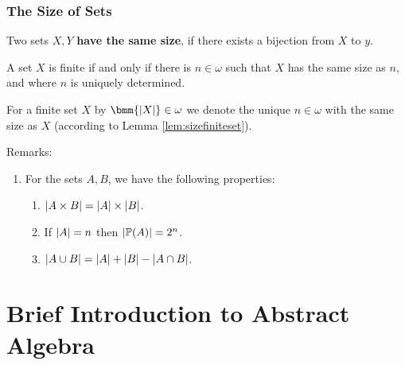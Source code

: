\documentclass[12pt]{book}
\begin{document}
\subsection{The Size of Sets}
\label{sec:sizeofsets}

\begin{defi}\label{def:equalsize}
      Two sets $X, Y$ \textbf{have the same size}, if there exists a bijection from $X$ to $y$.
\end{defi}
\begin{lem}\label{lem:sizefiniteset}
      A set $X$ is finite if and only if there is $n \in \omega$ such that $X$ has the same size as $n$, and where $n$ is uniquely determined.
\end{lem}
\begin{defi}\label{def:sizefiniteset}
      For a finite set $X$ by $\bmm{\abs{X}} \in \omega$ we denote the unique $n \in \omega$ with the same size as $X$ (according to Lemma 
	  \ref{lem:sizefiniteset}).
\end{defi}
Remarks:
\begin{enumerate}
      \item For the sets $A , B$, we have the following properties:
      \begin{enumerate}
            \item $\lvert A \times B  \rvert= \lvert A \rvert \times \lvert B \rvert$.
	        \item If $\lvert A \rvert = n$ then $\lvert \operatorname{\mathbb{P}}(A) \rvert = 2^n$.
	        \item $\lvert A \cup B \rvert = \lvert A \rvert + \lvert B \rvert - \lvert A \cap B \rvert$.
      \end{enumerate} 
\end{enumerate}
\chapter{Brief Introduction to Abstract Algebra}
\label{cha:Abstract Algebra}

\end{document}
